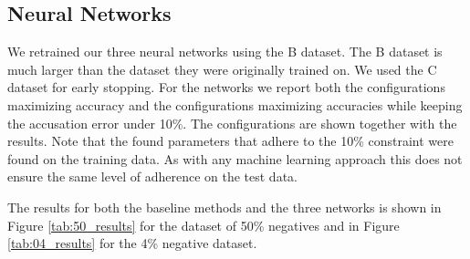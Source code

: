 \subsection{Neural Networks}

We retrained our three neural networks using the \gls{B} dataset. The \gls{B}
dataset is much larger than the dataset they were originally trained on. We used
the \gls{C} dataset for early stopping. For the networks we report both the
configurations maximizing accuracy and the configurations maximizing accuracies
while keeping the accusation error under 10\%. The configurations are shown
together with the results. Note that the found parameters that adhere to the
10\% constraint were found on the training data. As with any machine learning
approach this does not ensure the same level of adherence on the test data.

The results for both the baseline methods and the three networks is shown in
Figure \ref{tab:50_results} for the dataset of 50\% negatives and in Figure
\ref{tab:04_results} for the 4\% negative dataset. 

